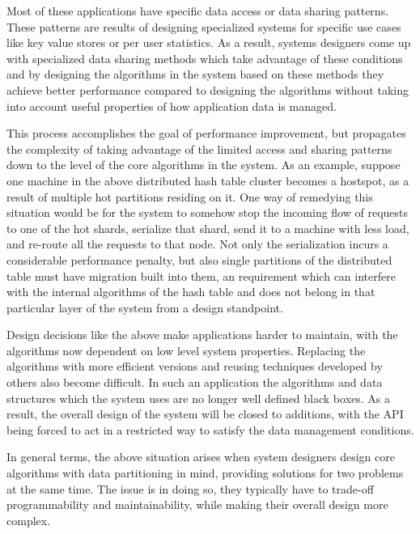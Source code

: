 Most of these applications have specific data access or data sharing patterns.
These patterns are results of designing specialized systems for specific
use cases like key value stores or per user statistics.
As a result, systems designers come up with specialized data sharing methods
which take advantage of these conditions and by designing the algorithms
in the system based on these methods they achieve better performance compared
to designing the algorithms without taking into account useful properties of
how application data is managed.

This process accomplishes the goal of performance improvement, but propagates
the complexity of taking advantage of the limited access and sharing patterns
down to the level of the core algorithms in the system. As an example, suppose
one machine in the above distributed hash table cluster becomes a hostspot,
as a result of multiple hot partitions residing on it. One way of
remedying this situation would be for the system to somehow stop the incoming
flow of requests to one of the hot shards, serialize that shard, send it to
a machine with less load, and re-route all the requests to that node. Not only
the serialization incurs a considerable performance penalty, but also
single partitions of the distributed table must have migration built into them,
an requirement which can interfere with the internal algorithms of the hash
table and does not belong in that particular layer of the system from a design
standpoint.

Design decisions like the above make applications harder to maintain, with the
algorithms now dependent on low level system properties. Replacing the
algorithms with more efficient versions and reusing techniques developed by
others also become difficult. In such an application
the algorithms and data structures which the system uses are no longer well
defined black boxes. As a result, the overall design of the system will be
closed to additions, with the API being forced to act in a restricted way to
satisfy the data management conditions.

In general terms, the above situation arises when system designers design
core algorithms with data partitioning in mind, providing solutions for two
problems at the same time. The issue is in doing so, they typically have to
trade-off programmability and maintainability, while making their overall design
more complex.

